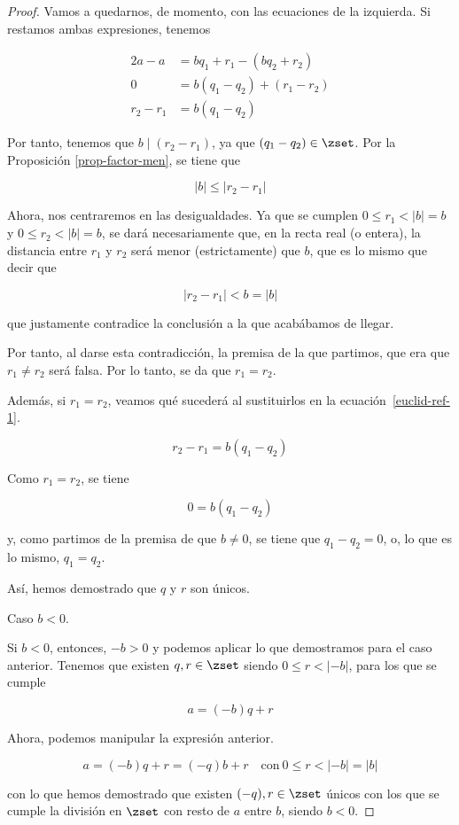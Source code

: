 \begin{proof}
  Vamos a quedarnos, de momento, con las ecuaciones de la izquierda. Si
  restamos ambas expresiones, tenemos

  \begin{alignat*}{2}
    a - a       &= b q_1 + r_1 - (b q_2 + r_2) \\
    0           &= b(q_1 - q_2) + (r_1 - r_2) \\
    r_2 - r_1   &= b(q_1 - q_2) \tag{*}\label{euclid-ref-1}
  \end{alignat*}

  Por tanto, tenemos que $b \mid (r_2 - r_1)$, ya que $(q_1 - q_2) \in
  \zset$. Por la Proposición \ref{prop-factor-men}, se tiene que

  $$ |b| \leq |r_2 - r_1| $$

  Ahora, nos centraremos en las desigualdades. Ya que se cumplen $0 \leq r_1
  < |b| = b$ y $0 \leq r_2 < |b| = b$, se dará necesariamente que, en la
  recta real (o entera), la distancia entre $r_1$ y $r_2$ será menor
  (estrictamente) que $b$, que es lo mismo que decir que

  $$ |r_2 - r_1| < b = |b| $$

  \noindent que justamente contradice la conclusión a la que acabábamos de
  llegar.

  Por tanto, al darse esta contradicción, la premisa de la que partimos, que
  era que $r_1 \neq r_2$ será falsa. Por lo tanto, se da que $r_1 = r_2$.

  Además, si $r_1 = r_2$, veamos qué sucederá al sustituirlos en la
  ecuación~\ref{euclid-ref-1}.

  $$ r_2 - r_1 = b(q_1 - q_2) $$

  \noindent Como $r_1 = r_2$, se tiene

  $$ 0 = b(q_1 - q_2) $$

  \noindent y, como partimos de la premisa de que $b \neq 0$, se tiene que
  $q_1 - q_2 = 0$, o, lo que es lo mismo, $q_1 = q_2$.

  Así, hemos demostrado que $q$ y $r$ son únicos.

  Caso $b < 0$.

  Si $b < 0$, entonces, ${-b} > 0$ y podemos aplicar lo que demostramos para
  el caso anterior. Tenemos que existen $q, r \in \zset$ siendo $0 \leq r <
  |{-b}|$, para los que se cumple

  $$ a = ({-b})q + r$$

  \noindent Ahora, podemos manipular la expresión anterior.

  $$ a = ({-b})q + r = ({-q})b + r \quad \text{con} \ 0 \leq r < |{-b}| =
  |b| $$

  \noindent con lo que hemos demostrado que existen $({-q}), r \in \zset$
  únicos con los que se cumple la división en $\zset$ con resto de $a$ entre
  $b$, siendo $b < 0$.
\end{proof}


